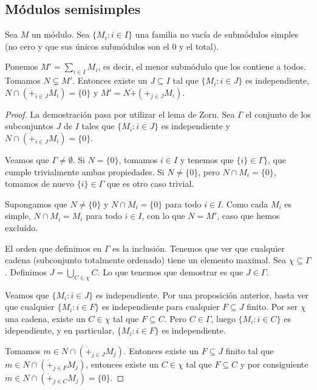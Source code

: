 \subsection{Módulos semisimples}

\begin{prop}
  Sea \(M\) un módulo.
  Sea \(\{M_i:i\in I\}\) una familia no vacía de submódulos simples
  (no cero y que sus únicos submódulos son el 0 y el total).

  Ponemos \(M'=\sum_{i\in I} M_i\), es decir, el menor submódulo que los
  contiene a todos. Tomamos  \(N\subsetneq M'\). Entonces existe un
  \(J\subseteq I\) tal que \(\{M_i:i\in J\}\) es independiente,
  \(N\cap\left(\dot{+}_{i\in J} M_i\right)=\{0\}\) y
  \(M'=N\dot{+}\left(\dot{+}_{j\in J} M_i\right)\).
\end{prop}
\begin{proof}
  La demostración pasa por utilizar el lema de Zorn.
  Sea \(\Gamma\) el conjunto de los subconjuntos \(J\) de \(I\) tales que
  \(\{M_i:i\in J\}\) es independiente y
  \(N\cap\left(\dot{+}_{i\in J} M_i\right)=\{0\}\).

  Veamos que \(\Gamma\neq\emptyset\). Si \(N=\{0\}\), tomamos \(i\in I\)
  y tenemos que \(\{i\}\in\Gamma\}\), que cumple trivialmente ambas
  propiedades. Si \(N\neq\{0\}\), pero \(N\cap M_i=\{0\}\), tomamos
  de nuevo \(\{i\}\in\Gamma\) que es otro caso trivial.

  Supongamos que \(N\neq\{0\}\) y \(N\cap M_i=\{0\}\) para todo \(i\in I\).
  Como cada \(M_i\) es simple, \(N\cap M_i=M_i\) para todo \(i\in I\),
  con lo que \(N=M'\), caso que hemos excluído.

  El orden que definimos en \(\Gamma\) es la inclusión. Tenemos que ver
  que cualquier cadena (subconjunto totalmente ordenado) tiene un elemento
  maximal. Sea \(\chi\subseteq\Gamma\). Definimos \(J=\bigcup_{C\in\chi} C\).
  Lo que tenemos que demostrar es que \(J\in \Gamma\).

  Veamos que \(\{M_i:i\in J\}\) es independiente. Por una proposición anterior,
  basta ver que cualquier \(\{M_i:i\in F\}\) es independiente para cualquier
  \(F\subseteq J\) finito. Por ser \(\chi\) una cadena, existe un \(C\in\chi\)
  tal que \(F\subseteq C\). Pero \(C\in\Gamma\), luego \(\{M_i:i\in C\}\)
  es idependiente, y en particular, \(\{M_i:i \in F\}\) es independiente.

  Tomamos \(m\in N\cap\left(\dot{+}_{j\in J} M_j\right)\). Entonces existe
  un \(F\subseteq J\) finito tal que \(m\in N\cap\left(\dot{+}_{j\in F}
  M_j\right)\), entonces existe un \(C\in\chi\) tal que \(F\subseteq C\)
  y por consiguiente \(m\in N\cap\left(\dot{+}_{j\in C} M_j\right)=\{0\}\).


\end{proof}
